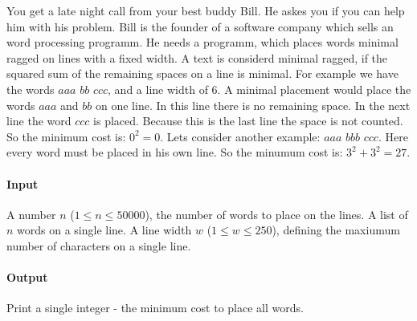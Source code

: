 



\makeheader

You get a late night call from your best buddy Bill. He askes you if you can help him with his problem.
Bill is the founder of a software company which sells an word processing programm. He needs a programm, which places words minimal ragged on lines with a fixed width.
A text is considerd minimal ragged, if the squared sum of the remaining spaces on a line is minimal.
For example we have the words $aaa$ $bb$ $ccc$, and a line width of 6.
A minimal placement would place the words $aaa$ and $bb$ on one line. In this line there is no remaining space.
In the next line the word $ccc$ is placed. Because this is the last line the space is not counted.
So the minimum cost is: $0^2 = 0$.
Lets consider another example: $aaa$ $bbb$ $ccc$. Here every word must be placed in his own line.
So the minumum cost is: $3^2+3^2= 27$.

\paragraph*{Input}
A number $n$ ($1 \leq n \leq 50000$), the number of words to place on the lines.
A list of $n$ words on a single line.
A line width $w$ ($1 \leq w \leq 250$), defining the maxiumum number of characters on a single line.

\paragraph*{Output}

Print a single integer - the minimum cost to place all words.

\begin{samples}
\end{samples}

